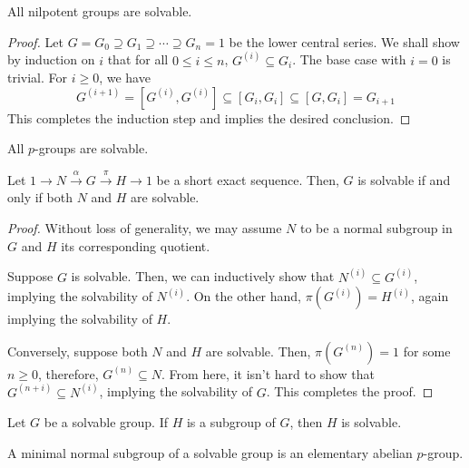 \begin{lemma}
    All nilpotent groups are solvable.
\end{lemma}
\begin{proof}
    Let $G = G_0\supseteq G_1\supseteq\cdots\supseteq G_n = 1$ be the lower central series. We shall show by induction on $i$ that for all $0\le i\le n$, $G^{(i)}\subseteq G_i$. The base case with $i = 0$ is trivial. For $i\ge 0$, we have 
    \begin{equation*}
        G^{(i + 1)} = [G^{(i)}, G^{(i)}] \subseteq [G_i, G_i]\subseteq [G,G_i] = G_{i + 1}
    \end{equation*}
    This completes the induction step and implies the desired conclusion.
\end{proof}

\begin{corollary}
    All $p$-groups are solvable.
\end{corollary}

\begin{theorem}
    Let $1\to N\stackrel{\alpha}{\longrightarrow} G\stackrel{\pi}{\longrightarrow} H\to 1$ be a short exact sequence. Then, $G$ is solvable if and only if both $N$ and $H$ are solvable.
\end{theorem}
\begin{proof}
    Without loss of generality, we may assume $N$ to be a normal subgroup in $G$ and $H$ its corresponding quotient.

    Suppose $G$ is solvable. Then, we can inductively show that $N^{(i)}\subseteq G^{(i)}$, implying the solvability of $N^{(i)}$. On the other hand, $\pi(G^{(i)}) = H^{(i)}$, again implying the solvability of $H$.

    Conversely, suppose both $N$ and $H$ are solvable. Then, $\pi(G^{(n)}) = 1$ for some $n\ge 0$, therefore, $G^{(n)}\subseteq N$. From here, it isn't hard to show that $G^{(n + i)}\subseteq N^{(i)}$, implying the solvability of $G$. This completes the proof.
\end{proof}

\begin{corollary}
    Let $G$ be a solvable group. If $H$ is a subgroup of $G$, then $H$ is solvable.
\end{corollary}

\begin{proposition}
    A minimal normal subgroup of a solvable group is an elementary abelian $p$-group.
\end{proposition}

